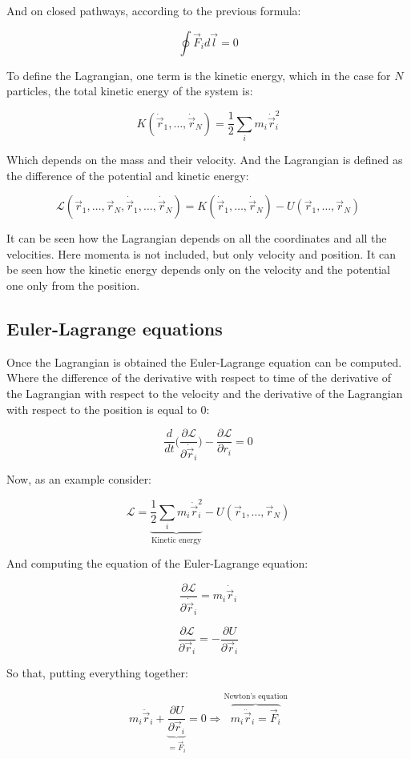 And on closed pathways, according to the previous formula:

$$\oint\vec{F}_id\vec{l} = 0$$

To define the Lagrangian, one term is the kinetic energy, which in the case for $N$ particles, the total kinetic energy of the system is:

$$K(\dot{\vec{r}}_1, \dots, \dot{\vec{r}}_N) = \frac{1}{2}\sum\limits_im_i\dot{\vec{r}}_i^2$$

Which depends on the mass and their velocity.
And the Lagrangian is defined as the difference of the potential and kinetic energy:

$$\mathcal{L}(\vec{r}_1, \dots, \vec{r}_N, \dot{\vec{r}}_1, \dots, \dot{\vec{r}}_N) = K(\dot{\vec{r}}_1, \dots, \dot{\vec{r}}_N)- U(\vec{r}_1, \dots, \vec{r}_N)$$

It can be seen how the Lagrangian depends on all the coordinates and all the velocities.
Here momenta is not included, but only velocity and position.
It can be seen how the kinetic energy depends only on the velocity and the potential one only from the position.

	\subsection{Euler-Lagrange equations}
	Once the Lagrangian is obtained the Euler-Lagrange equation can be computed.
	Where the difference of the derivative with respect to time of the derivative of the Lagrangian with respect to the velocity and the derivative of the Lagrangian with respect to the position is equal to $0$:

	$$\frac{d}{dt}\biggl(\frac{\partial\mathcal{L}}{\partial \dot{\vec{r}}_i}\biggr)-\frac{\partial\mathcal{L}}{\partial r_i} = 0$$

	Now, as an example consider:

	$$\mathcal{L} = \underbrace{\frac{1}{2}\sum\limits_i m_i\dot{\vec{r}}_i^2}_{\text{Kinetic energy}} - U(\vec{r}_1, \dots, \vec{r}_N)$$

	And computing the equation of the Euler-Lagrange equation:

	$$\frac{\partial\mathcal{L}}{\partial\dot{\vec{r}}_i} = m_i\dot{\vec{r}}_i$$

	$$\frac{\partial\mathcal{L}}{\partial\vec{r}_i} = -\frac{\partial U}{\partial\vec{r}_i}$$

	So that, putting everything together:

	$$m_i\ddot{\vec{r}}_i +\underbrace{\frac{\partial U}{\partial\vec{r}_i}}_{=\vec{F}_i} = 0\Rightarrow \overbrace{m_i\ddot{\vec{r}}_i = \vec{F}_i}^{\text{Newton's equation}}$$

